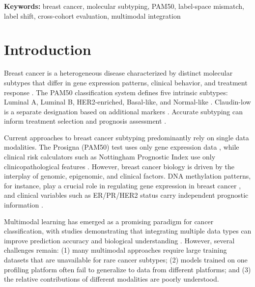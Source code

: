 \documentclass[11pt,a4paper]{article}
\begin{document}
\begin{abstract}
\textbf{Conclusions:} Cohort-level performance is not directly comparable when annotation standards define different label spaces, and the target cohort's allowed labels should be established before computing comparative metrics; in these experiments, unlabeled predictions alone did not identify the absent class. The same discipline applies to modality fusion: in the one cohort pair where the multimodal model could be evaluated under an identical input definition, its advantage was internal only.
\end{abstract}


\textbf{Keywords:} breast cancer, molecular subtyping, PAM50, label-space mismatch, label shift, cross-cohort evaluation, multimodal integration

\section{Introduction}
\label{sec:intro}

Breast cancer is a heterogeneous disease characterized by distinct molecular subtypes that differ in gene expression patterns, clinical behavior, and treatment response \citep{perou2000molecular}. The PAM50 classification system defines five intrinsic subtypes: Luminal A, Luminal B, HER2-enriched, Basal-like, and Normal-like \citep{parker2009supervised}. Claudin-low is a separate designation based on additional markers \citep{prat2010phenotypic}. Accurate subtyping can inform treatment selection and prognosis assessment \citep{prat2014research}.

Current approaches to breast cancer subtyping predominantly rely on single data modalities. The Prosigna (PAM50) test uses only gene expression data \citep{parker2009supervised}, while clinical risk calculators such as Nottingham Prognostic Index use only clinicopathological features \citep{haybittle1982prognostic}. However, breast cancer biology is driven by the interplay of genomic, epigenomic, and clinical factors. DNA methylation patterns, for instance, play a crucial role in regulating gene expression in breast cancer \citep{pasculli2018epigenetics}, and clinical variables such as ER/PR/HER2 status carry independent prognostic information \citep{goldhirsch2013personalizing}.

Multimodal learning has emerged as a promising paradigm for cancer classification, with studies demonstrating that integrating multiple data types can improve prediction accuracy and biological understanding \citep{wang2014similarity, chaudhary2018deep, sharifinoghabi2019moli}. However, several challenges remain: (1) many multimodal approaches require large training datasets that are unavailable for rare cancer subtypes; (2) models trained on one profiling platform often fail to generalize to data from different platforms; and (3) the relative contributions of different modalities are poorly understood.
\end{document}

